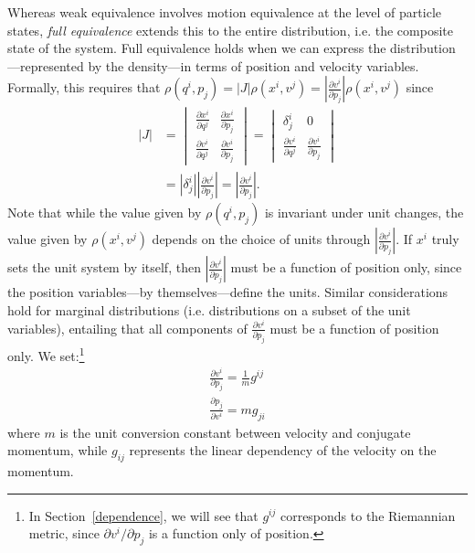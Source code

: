 \documentclass[letterpaper]{article}
\begin{document}
Whereas weak equivalence involves motion equivalence at the level of particle states, \textit{full equivalence} extends this to the entire distribution, i.e. the composite state of the system. Full equivalence holds when we can express the distribution---represented by the density---in terms of position and velocity variables. Formally, this requires that $\rho(q^i, p_j) = |J| \rho(x^i, v^j) = \left|\frac{\partial v^i}{\partial p_j}\right| \rho(x^i, v^j)$ since
\begin{equation}
\begin{aligned}
|J| &= \begin{vmatrix}
\frac{\partial x^i}{\partial q^j} & \frac{\partial x^i}{\partial p_j} \\
\frac{\partial v^i}{\partial q^j} & \frac{\partial v^i}{\partial p_j}
\end{vmatrix}
= \begin{vmatrix}
\delta^i_j & 0 \\
\frac{\partial v^i}{\partial q^j} & \frac{\partial v^i}{\partial p_j}
\end{vmatrix} \\
&= \left|\delta^i_j\right| \left|\frac{\partial v^i}{\partial p_j}\right| 
= \left|\frac{\partial v^i}{\partial p_j}\right|.
\end{aligned}
\end{equation}
Note that while the value given by $\rho(q^i, p_j)$ is invariant under unit changes, the value given by $\rho(x^i, v^j)$ depends on the choice of units through $\left|\frac{\partial v^i}{\partial p_j}\right|$. If $x^i$ truly sets the unit system by itself, then $\left|\frac{\partial v^i}{\partial p_j}\right|$ must be a function of position only, since the position variables---by themselves---define the units. Similar considerations hold for marginal distributions (i.e. distributions on a subset of the unit variables), entailing that all components of $\frac{\partial v^i}{\partial p_j}$ must be a function of position only. We set:\footnote{In Section~\ref{dependence}, we will see that $g^{ij}$ corresponds to the Riemannian metric, since $\partial v^i/\partial p_j$ is a function only of position.}
\begin{equation}
\begin{aligned}
\frac{\partial v^i}{\partial p_j} = \frac{1}{m} g^{ij} \\
\frac{\partial p_j}{\partial v^i} = m g_{ji}
\end{aligned}
\end{equation}
where $m$ is the unit conversion constant between velocity and conjugate momentum, while $g_{ij}$ represents the linear dependency of the velocity on the momentum. 
\end{document}
